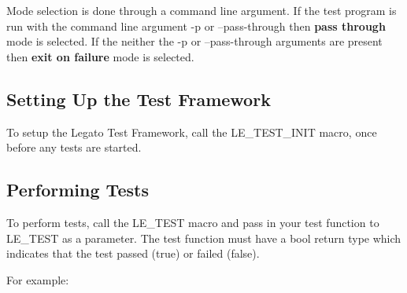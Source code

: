 Mode selection is done through a command line argument. If the test program is run with the command line argument \textquotesingle{}-\/p\textquotesingle{} or \textquotesingle{}--pass-\/through\textquotesingle{} then {\bfseries pass through} mode is selected. If the neither the \textquotesingle{}-\/p\textquotesingle{} or \textquotesingle{}--pass-\/through\textquotesingle{} arguments are present then {\bfseries exit on failure} mode is selected.\hypertarget{c_test_c_test_setup}{}\subsection{Setting Up the Test Framework}\label{c_test_c_test_setup}
To setup the Legato Test Framework, call the {\ttfamily L\+E\+\_\+\+T\+E\+S\+T\+\_\+\+I\+N\+I\+T} macro, once before any tests are started.\hypertarget{c_test_c_test_testing}{}\subsection{Performing Tests}\label{c_test_c_test_testing}
To perform tests, call the {\ttfamily L\+E\+\_\+\+T\+E\+S\+T} macro and pass in your test function to L\+E\+\_\+\+T\+E\+S\+T as a parameter. The test function must have a bool return type which indicates that the test passed (true) or failed (false).

For example\+:


